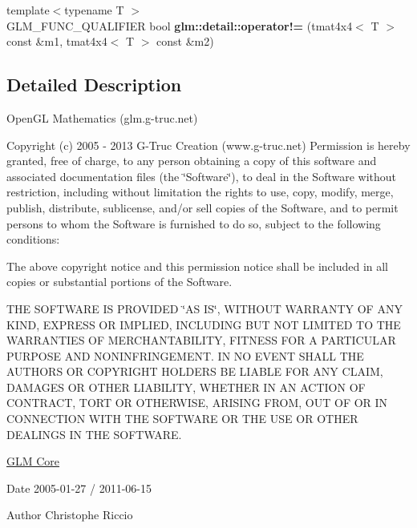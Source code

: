 \begin{DoxyCompactItemize}
\item 
\hypertarget{namespaceglm_1_1detail_abb049d564233df24dda4531d2a1e2ad3}{}{\footnotesize template$<$typename T $>$ }\\G\+L\+M\+\_\+\+F\+U\+N\+C\+\_\+\+Q\+U\+A\+L\+I\+F\+I\+E\+R bool {\bfseries glm\+::detail\+::operator!=} (tmat4x4$<$ T $>$ const \&m1, tmat4x4$<$ T $>$ const \&m2)\label{namespaceglm_1_1detail_abb049d564233df24dda4531d2a1e2ad3}

\end{DoxyCompactItemize}


\subsection{Detailed Description}
Open\+G\+L Mathematics (glm.\+g-\/truc.\+net)

Copyright (c) 2005 -\/ 2013 G-\/\+Truc Creation (www.\+g-\/truc.\+net) Permission is hereby granted, free of charge, to any person obtaining a copy of this software and associated documentation files (the \char`\"{}\+Software\char`\"{}), to deal in the Software without restriction, including without limitation the rights to use, copy, modify, merge, publish, distribute, sublicense, and/or sell copies of the Software, and to permit persons to whom the Software is furnished to do so, subject to the following conditions\+:

The above copyright notice and this permission notice shall be included in all copies or substantial portions of the Software.

T\+H\+E S\+O\+F\+T\+W\+A\+R\+E I\+S P\+R\+O\+V\+I\+D\+E\+D \char`\"{}\+A\+S I\+S\char`\"{}, W\+I\+T\+H\+O\+U\+T W\+A\+R\+R\+A\+N\+T\+Y O\+F A\+N\+Y K\+I\+N\+D, E\+X\+P\+R\+E\+S\+S O\+R I\+M\+P\+L\+I\+E\+D, I\+N\+C\+L\+U\+D\+I\+N\+G B\+U\+T N\+O\+T L\+I\+M\+I\+T\+E\+D T\+O T\+H\+E W\+A\+R\+R\+A\+N\+T\+I\+E\+S O\+F M\+E\+R\+C\+H\+A\+N\+T\+A\+B\+I\+L\+I\+T\+Y, F\+I\+T\+N\+E\+S\+S F\+O\+R A P\+A\+R\+T\+I\+C\+U\+L\+A\+R P\+U\+R\+P\+O\+S\+E A\+N\+D N\+O\+N\+I\+N\+F\+R\+I\+N\+G\+E\+M\+E\+N\+T. I\+N N\+O E\+V\+E\+N\+T S\+H\+A\+L\+L T\+H\+E A\+U\+T\+H\+O\+R\+S O\+R C\+O\+P\+Y\+R\+I\+G\+H\+T H\+O\+L\+D\+E\+R\+S B\+E L\+I\+A\+B\+L\+E F\+O\+R A\+N\+Y C\+L\+A\+I\+M, D\+A\+M\+A\+G\+E\+S O\+R O\+T\+H\+E\+R L\+I\+A\+B\+I\+L\+I\+T\+Y, W\+H\+E\+T\+H\+E\+R I\+N A\+N A\+C\+T\+I\+O\+N O\+F C\+O\+N\+T\+R\+A\+C\+T, T\+O\+R\+T O\+R O\+T\+H\+E\+R\+W\+I\+S\+E, A\+R\+I\+S\+I\+N\+G F\+R\+O\+M, O\+U\+T O\+F O\+R I\+N C\+O\+N\+N\+E\+C\+T\+I\+O\+N W\+I\+T\+H T\+H\+E S\+O\+F\+T\+W\+A\+R\+E O\+R T\+H\+E U\+S\+E O\+R O\+T\+H\+E\+R D\+E\+A\+L\+I\+N\+G\+S I\+N T\+H\+E S\+O\+F\+T\+W\+A\+R\+E.

\hyperlink{group__core}{G\+L\+M Core}

\begin{DoxyDate}{Date}
2005-\/01-\/27 / 2011-\/06-\/15 
\end{DoxyDate}
\begin{DoxyAuthor}{Author}
Christophe Riccio 
\end{DoxyAuthor}
